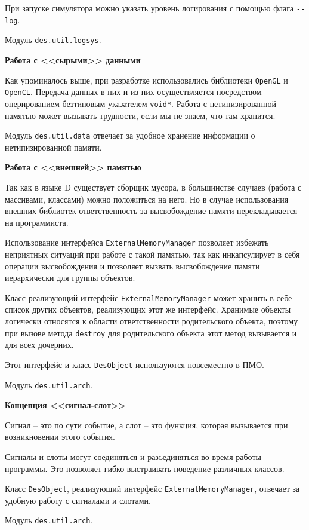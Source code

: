 При запуске симулятора можно указать уровень логирования с помощью флага \verb|--log|.

Модуль \verb|des.util.logsys|.

\textbf{Работа с <<сырыми>> данными}

Как упоминалось выше, при разработке использовались библиотеки \verb|OpenGL| и 
\verb|OpenCL|. Передача данных в них и из них осуществляется посредством
оперированием безтиповым указателем \verb|void*|. Работа с нетипизированной
памятью может вызывать трудности, если мы не знаем, что там хранится.

Модуль \verb|des.util.data| отвечает за удобное хранение информации о
нетипизированной памяти.

\textbf{Работа с <<внешней>> памятью}

Так как в языке D существует сборщик мусора, в большинстве случаев
(работа с массивами, классами) можно положиться на него. Но в случае
использования внешних библиотек ответственность за высвобождение
памяти перекладывается на программиста.

Использование интерфейса \verb|ExternalMemoryManager| позволяет избежать неприятных ситуаций
при работе с такой памятью, так как инкапсулирует в себя операции высвобождения и позволяет
вызвать высвобождение памяти иерархически для группы объектов.

Класс реализующий интерфейс \verb|ExternalMemoryManager| может хранить в себе список
других объектов, реализующих этот же интерфейс. Хранимые объекты логически относятся
к области ответственности родительского объекта, поэтому при вызове метода
\verb|destroy| для родительского объекта этот метод вызывается и для всех дочерних.

Этот интерфейс и класс \verb|DesObject| используются повсеместно в ПМО.

Модуль \verb|des.util.arch|.

\newpage
\textbf{Концепция <<сигнал-слот>>}

Сигнал -- это по сути событие, а слот -- это функция, которая вызывается при
возникновении этого события.

Сигналы и слоты могут соединяться и разъединяться во время работы программы.
Это позволяет гибко выстраивать поведение различных классов.

Класс \verb|DesObject|, реализующий интерфейс \verb|ExternalMemoryManager|,
отвечает за удобную работу с сигналами и слотами.

Модуль \verb|des.util.arch|.


